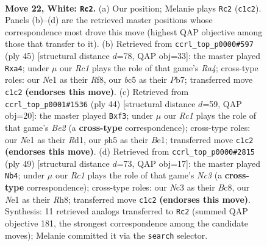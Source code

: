\documentclass[11pt]{article}
\begin{document}
\clearpage

\begin{figure}[p]\centering
\begin{subfigure}{0.46\textwidth}\centering
\resizebox{\linewidth}{!}{%
\newchessgame
\chessboard[
  setfen={rnbr2k1/5p2/1p2pn2/2b4p/2B1P3/2N3BP/Pp3PK1/1RR1N3 w - - 0 22},
  showmover=false,
  pgfstyle=straightmove, color=movearrow, markmove={c1-c2}
]}
\caption{}
\end{subfigure}\hfill
\begin{subfigure}{0.46\textwidth}\centering
\resizebox{\linewidth}{!}{%
\newchessgame
\chessboard[
  setfen={5rk1/1p2ppb1/2np4/r5p1/Rn1P4/2N1PNB1/1P3PP1/5RK1 b - - 0 23},
  showmover=false,
  pgfstyle=straightmove, color=movearrow, markmove={a5-a4}
]}
\caption{}
\end{subfigure}
\\[4pt]
\begin{subfigure}{0.46\textwidth}\centering
\resizebox{\linewidth}{!}{%
\newchessgame
\chessboard[
  setfen={r4k2/1r1b1pp1/p1p1pn1p/2b4P/2N4R/P4p2/1PP1B1P1/2KRB3 w - - 0 23},
  showmover=false,
  pgfstyle=straightmove, color=movearrow, markmove={e2-f3}
]}
\caption{}
\end{subfigure}\hfill
\begin{subfigure}{0.46\textwidth}\centering
\resizebox{\linewidth}{!}{%
\newchessgame
\chessboard[
  setfen={1rb1k2r/5pp1/p1nb4/3PpP1p/4P3/1N6/RP2BB1P/5R1K b k - 0 25},
  showmover=false,
  pgfstyle=straightmove, color=movearrow, markmove={c6-b4}
]}
\caption{}
\end{subfigure}
\caption{\textbf{Move 22, White: \texttt{Rc2}.} (a) Our position; Melanie plays \texttt{Rc2} (\texttt{c1c2}). Panels (b)--(d) are the retrieved master positions whose correspondence most drove this move (highest QAP objective among those that transfer to it). (b) Retrieved from \texttt{ccrl\_top\_p0000\#597} (ply 45) [structural distance $d$=78, QAP obj=33]: the master played \texttt{Rxa4}; under $\mu$ our \emph{Rc1} plays the role of that game's \emph{Ra4}; cross-type roles: our \emph{N}e1 as their \emph{R}f8, our \emph{b}c5 as their \emph{P}b7; transferred move \texttt{c1c2} \textbf{(endorses this move)}. (c) Retrieved from \texttt{ccrl\_top\_p0001\#1536} (ply 44) [structural distance $d$=59, QAP obj=20]: the master played \texttt{Bxf3}; under $\mu$ our \emph{Rc1} plays the role of that game's \emph{Be2} (a \textbf{cross-type} correspondence); cross-type roles: our \emph{N}e1 as their \emph{R}d1, our \emph{p}h5 as their \emph{B}e1; transferred move \texttt{c1c2} \textbf{(endorses this move)}. (d) Retrieved from \texttt{ccrl\_top\_p0000\#2815} (ply 49) [structural distance $d$=73, QAP obj=17]: the master played \texttt{Nb4}; under $\mu$ our \emph{Rc1} plays the role of that game's \emph{Nc3} (a \textbf{cross-type} correspondence); cross-type roles: our \emph{N}c3 as their \emph{B}c8, our \emph{N}e1 as their \emph{R}h8; transferred move \texttt{c1c2} \textbf{(endorses this move)}. Synthesis: 11 retrieved analogs transferred to \texttt{Rc2} (summed QAP objective 181, the strongest correspondence among the candidate moves); Melanie committed it via the \texttt{search} selector.}
\label{fig:thought-m42}
\end{figure}
\end{document}
